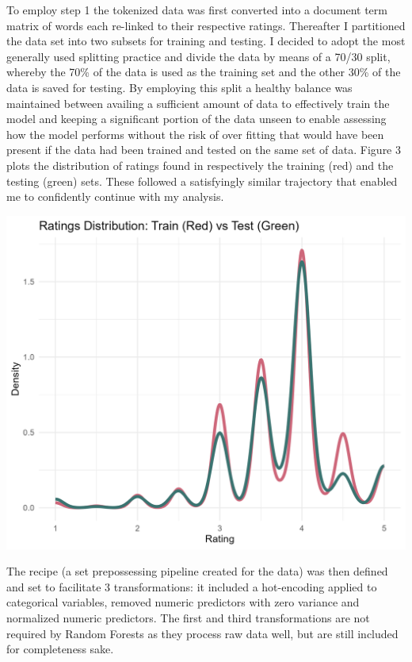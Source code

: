 \documentclass[11pt,preprint]{elsarticle}
\let\origfigure\figure
\let\endorigfigure\endfigure
\renewenvironment{figure}[1][2] {
    \expandafter\origfigure\expandafter[H]
} {
    \endorigfigure
}
\numberwithin{equation}{section}
\numberwithin{figure}{section}
\numberwithin{table}{section}
\begin{document}
To employ step 1 the tokenized data was first converted into a document
term matrix of words each re-linked to their respective ratings.
Thereafter I partitioned the data set into two subsets for training and
testing. I decided to adopt the most generally used splitting practice
and divide the data by means of a 70/30 split, whereby the 70\% of the
data is used as the training set and the other 30\% of the data is saved
for testing. By employing this split a healthy balance was maintained
between availing a sufficient amount of data to effectively train the
model and keeping a significant portion of the data unseen to enable
assessing how the model performs without the risk of over fitting that
would have been present if the data had been trained and tested on the
same set of data. Figure 3 plots the distribution of ratings found in
respectively the training (red) and the testing (green) sets. These
followed a satisfyingly similar trajectory that enabled me to
confidently continue with my analysis.

\begin{figure}[H]

{\centering \includegraphics[width=0.8\linewidth]{writeup/fig3} 

}

\caption{Distribution of training and testing data}\label{fig:fig3}
\end{figure}

The recipe (a set prepossessing pipeline created for the data) was then
defined and set to facilitate 3 transformations: it included a
hot-encoding applied to categorical variables, removed numeric
predictors with zero variance and normalized numeric predictors. The
first and third transformations are not required by Random Forests as
they process raw data well, but are still included for completeness
sake.
\end{document}
